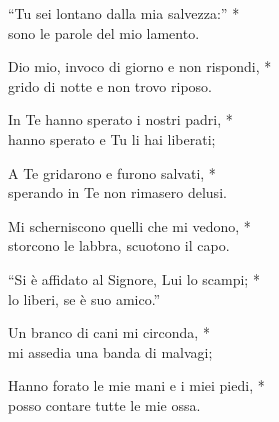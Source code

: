 

\spazio

\strofa ``Tu sei lontano dalla mia salvezza:'' *\\
sono le parole del mio lamento.

\spazio


\spazio

\strofa Dio mio, invoco di giorno e non rispondi, *\\
grido di notte e non trovo riposo.

\spazio


\spazio

\strofa In Te hanno sperato i nostri padri, *\\
hanno sperato e Tu li hai liberati;

\spazio


\spazio

\strofa A Te gridarono e furono salvati, *\\
sperando in Te non rimasero delusi.

\spazio


\spazio

\strofa Mi scherniscono quelli che mi vedono, *\\
storcono le labbra, scuotono il capo.

\spazio


\spazio

\strofa ``Si è affidato al Signore, Lui lo scampi; *\\
lo liberi, se è suo amico.''

\spazio


\spazio

\strofa Un branco di cani mi circonda, *\\
mi assedia una banda di malvagi;

\spazio


\spazio

\strofa Hanno forato le mie mani e i miei piedi, *\\
posso contare tutte le mie ossa.

